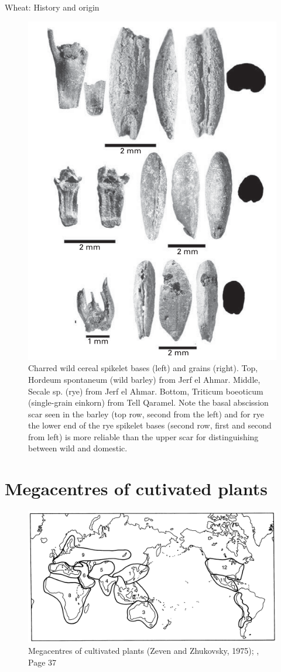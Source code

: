 \documentclass[
  ignorenonframetext,
  aspectratio=169]{beamer}
\begin{document}
\begin{frame}{Wheat: History and origin}
\protect\hypertarget{wheat-history-and-origin}{}
\begin{figure}
\includegraphics[width=0.3\linewidth]{./../images/charred_grass_grains} \caption{Charred wild cereal spikelet bases (left) and grains (right). Top, Hordeum spontaneum (wild barley) from Jerf el Ahmar. Middle, Secale sp. (rye) from Jerf el Ahmar. Bottom, Triticum boeoticum (single-grain einkorn) from Tell Qaramel. Note the basal abscission scar seen in the barley (top row, second from the left) and for rye the lower end of the rye spikelet bases (second row, first and second from left) is more reliable than the upper scar for distinguishing between wild and domestic.}\label{fig:wheat-barley-archaeology}
\end{figure}
\end{frame}

\hypertarget{megacentres-of-cutivated-plants}{%
\section{Megacentres of cutivated
plants}\label{megacentres-of-cutivated-plants}}

\begin{frame}{}
\protect\hypertarget{section-11}{}
\begin{figure}
\includegraphics[width=0.55\linewidth]{./../images/megacentres_cultivated} \caption{Megacentres of cultivated plants (Zeven and Zhukovsky, 1975); \cite{hayward2012plant}, Page 37}\label{fig:cultivated-megacentres}
\end{figure}
\end{frame}
\end{document}
